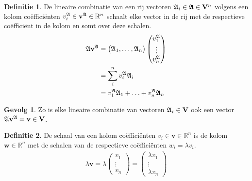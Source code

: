 \documentclass{amsart}
\theoremstyle{definition}
\newtheorem{dfn}{Definitie}[section]
\newtheorem{csq}{Gevolg}[section]
\newcommand{\realnums}{\mathbb{R}}
\newcommand{\realn}[1][n]{\realnums^{#1}}
\newcommand{\vecspace}[1][v]{\mathrm{\mathbf{\MakeUppercase#1}}}
\newcommand{\vecspacen}[1][n]{\vecspace^#1}
\newcommand{\vvec}[1][v]{\mathbf{#1}}
\newcommand{\vecrow}[1][a]{\mathfrak{\MakeUppercase{#1}}}
\newcommand{\rvec}[2][i]{{#2}_{#1}}
\newcommand{\rvecr}[2][i]{\rvec[#1]{\vecrow[#2]}}
\newcommand{\rveci}[1][i]{\rvecr[#1]{a}}
\newcommand{\cvec}[2]{{#1}^{#2}}
\newcommand{\cvecv}[2][v]{\cvec{\vvec[#1]}{#2}}
\newcommand{\cvecva}[1][a]{\cvecv{\vecrow[#1]}}
\newcommand{\vcord}[3]{{#1}_{#2}^{#3}}
\newcommand{\vcordv}[3][v]{\vcord{#1}{#2}{\vecrow[#3]}}
\newcommand{\vcordvi}[2][i]{\vcordv{#1}{#2}}
\newcommand{\vcordvia}[1][i]{\vcordvi[#1]{a}}
\begin{document}
\begin{dfn}
	De lineaire combinatie van een rij vectoren $\rveci \in \vecrow \in \vecspacen$ volgens een kolom coëfficiënten $\vcordvia \in \cvecva \in \mathbb{R}^n$
	schaalt elke vector in de rij met de respectieve coëfficiënt in de kolom en somt over deze schalen.
	\begin{align*}
		\vecrow \cvecva
		 & =
		\begin{pmatrix}
			\rveci[1], \ldots, \rveci[n]
		\end{pmatrix}
		\begin{pmatrix}
			\vcordvia[1] \\
			\vdots       \\
			\vcordvia[n]
		\end{pmatrix}
		\\ & = \sum_i^n \vcordvia \rveci
		\\ & = \vcordvia[1] \rveci[1] + \ldots + \vcordvia[n] \rveci[n]
	\end{align*}
\end{dfn}

\begin{csq}
	Zo is elke lineaire combinatie van vectoren $\rveci \in \vecspace$ ook een vector $\vecrow \cvecva = \vvec \in \vecspace$.
\end{csq}

\begin{dfn}
	De schaal van een kolom coëfficiënten $v_i \in \vvec \in \realn$ is de kolom $\vvec[w] \in \realn$ met de schalen van de respectieve coëfficiënten ${w}_i = \lambda {v}_i$.
	\begin{align*}
		\lambda \vvec =
		\lambda
		\begin{pmatrix}
			v_1    \\
			\vdots \\
			v_n
		\end{pmatrix}
		=
		\begin{pmatrix}
			\lambda v_1 \\
			\vdots      \\
			\lambda v_n
		\end{pmatrix}
	\end{align*}
\end{dfn}
\end{document}
